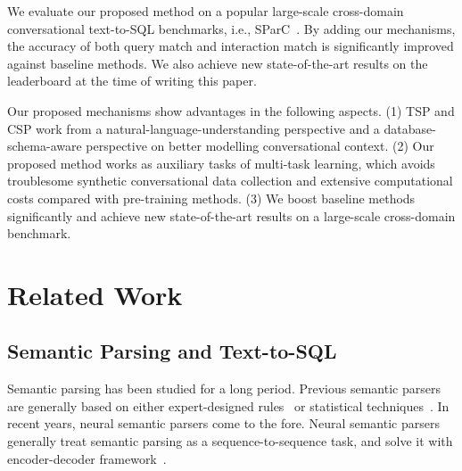 \documentclass[a4paper]{article}
\begin{document}
We evaluate our proposed method on a popular large-scale cross-domain conversational text-to-SQL benchmarks, i.e., SParC~\cite{yu2019sparc}. By adding our mechanisms, the accuracy of both query match and interaction match is significantly improved against baseline methods. We also achieve new state-of-the-art results on the leaderboard at the time of writing this paper. 

Our proposed mechanisms show advantages in the following aspects. (1) TSP and CSP work from a natural-language-understanding perspective and a database-schema-aware perspective on better modelling conversational context. (2) Our proposed method works as auxiliary tasks of multi-task learning, which avoids troublesome synthetic conversational data collection and extensive computational costs compared with pre-training methods. (3) We boost baseline methods significantly and achieve new state-of-the-art results on a large-scale cross-domain benchmark.

\section{Related Work}

\subsection{Semantic Parsing and Text-to-SQL}
Semantic parsing has been studied for a long period. Previous semantic parsers are generally based on either expert-designed rules~\cite{thompson1969rel,woods1973progress,templeton1983problems} or statistical techniques~\cite{zelle1996learning,thompson2003acquiring,kwiatkowksi2010inducing}. In recent years, neural semantic parsers come to the fore. Neural semantic parsers generally treat semantic parsing as a sequence-to-sequence task, and solve it with encoder-decoder framework~\cite{dong2016language,jia2016data,cheng2017learning,krishnamurthy2017neural,dong2018confidence}.
\end{document}
